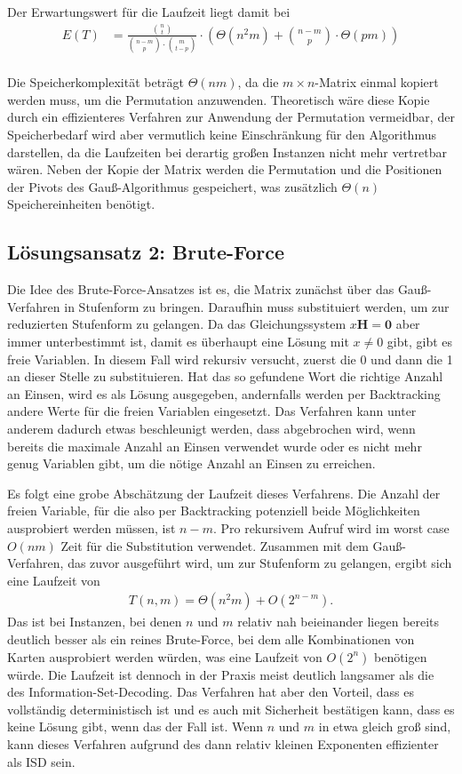 \documentclass[a4paper,10pt,ngerman]{scrartcl}
\begin{document}
Der Erwartungswert für die Laufzeit liegt damit bei 
\begin{align*}
    E(T) &= \frac{\binom{n}{t}}{\binom{n-m}{p} \cdot \binom{m}{t-p}} \cdot \left(\Theta(n^2m) + \binom{n-m}{p}\cdot \Theta(pm)\right) \\
\end{align*}

Die Speicherkomplexität beträgt $\Theta(nm)$, da die $m \times n$-Matrix einmal kopiert werden muss, um die Permutation anzuwenden. Theoretisch wäre diese Kopie durch ein effizienteres Verfahren zur Anwendung der Permutation vermeidbar, der Speicherbedarf wird aber vermutlich keine Einschränkung für den Algorithmus darstellen, da die Laufzeiten bei derartig großen Instanzen nicht mehr vertretbar wären. 
Neben der Kopie der Matrix werden die Permutation und die Positionen der Pivots des Gauß-Algorithmus gespeichert, was zusätzlich $\Theta(n)$ Speichereinheiten benötigt. 

\subsection{Lösungsansatz 2: Brute-Force}
Die Idee des Brute-Force-Ansatzes ist es, die Matrix zunächst über das Gauß-Verfahren in Stufenform zu bringen. Daraufhin muss substituiert werden, um zur reduzierten Stufenform zu gelangen. 
Da das Gleichungssystem $x\mathbf{H} = \mathbf{0}$ aber immer unterbestimmt ist, damit es überhaupt eine Lösung mit $x \neq 0$ gibt, gibt es freie Variablen.
In diesem Fall wird rekursiv versucht, zuerst die 0 und dann die 1 an dieser Stelle zu substituieren. 
Hat das so gefundene Wort die richtige Anzahl an Einsen, wird es als Lösung ausgegeben, andernfalls werden per Backtracking andere Werte für die freien Variablen eingesetzt. 
Das Verfahren kann unter anderem dadurch etwas beschleunigt werden, dass abgebrochen wird, wenn bereits die maximale Anzahl an Einsen verwendet wurde oder es nicht mehr genug Variablen gibt, um die nötige Anzahl an Einsen zu erreichen. 

Es folgt eine grobe Abschätzung der Laufzeit dieses Verfahrens.
Die Anzahl der freien Variable, für die also per Backtracking potenziell beide Möglichkeiten ausprobiert werden müssen, ist $n-m$. Pro rekursivem Aufruf wird im worst case $O(nm)$ Zeit für die Substitution verwendet. Zusammen mit dem Gauß-Verfahren, das zuvor ausgeführt wird, um zur Stufenform zu gelangen, ergibt sich eine Laufzeit von 
\begin{align*}
    T(n,m) = \Theta(n^2m) + O(2^{n-m}).
\end{align*}
Das ist bei Instanzen, bei denen $n$ und $m$ relativ nah beieinander liegen bereits deutlich besser als ein reines Brute-Force, bei dem alle Kombinationen von Karten ausprobiert werden würden, was eine Laufzeit von $O(2^n)$ benötigen würde.
Die Laufzeit ist dennoch in der Praxis meist deutlich langsamer als die des Information-Set-Decoding.  
Das Verfahren hat aber den Vorteil, dass es vollständig deterministisch ist und es auch mit Sicherheit bestätigen kann, dass es keine Lösung gibt, wenn das der Fall ist. 
Wenn $n$ und $m$ in etwa gleich groß sind, kann dieses Verfahren aufgrund des dann relativ kleinen Exponenten effizienter als ISD sein.
\end{document}
